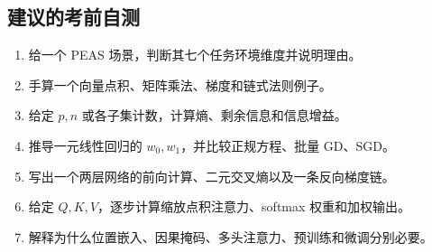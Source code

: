 \documentclass[UTF8,11pt,a4paper]{ctexart}
\begin{document}
\subsection{建议的考前自测}
\begin{enumerate}
\item 给一个 PEAS 场景，判断其七个任务环境维度并说明理由。
\item 手算一个向量点积、矩阵乘法、梯度和链式法则例子。
\item 给定 $p,n$ 或各子集计数，计算熵、剩余信息和信息增益。
\item 推导一元线性回归的 $w_0,w_1$，并比较正规方程、批量 GD、SGD。
\item 写出一个两层网络的前向计算、二元交叉熵以及一条反向梯度链。
\item 给定 $Q,K,V$，逐步计算缩放点积注意力、softmax 权重和加权输出。
\item 解释为什么位置嵌入、因果掩码、多头注意力、预训练和微调分别必要。
\end{enumerate}
\end{document}
